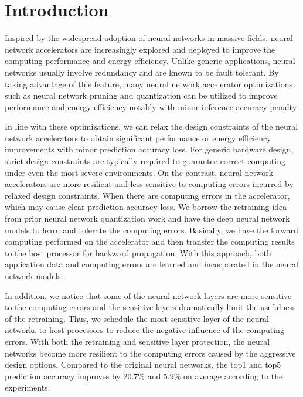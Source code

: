 \section{Introduction} \label{sec:intro}
Inspired by the widespread adoption of neural networks in massive fields, neural network accelerators 
\cite{deepburing_12,DiCecco_4} 
are increasingly explored and deployed to improve the computing performance and energy efficiency.
Unlike generic applications, neural networks usually involve redundancy and are known to be 
fault tolerant\cite{Reagen2016}. By taking advantage of this feature, many neural network accelerator optimizations 
such as neural network pruning and quantization can be utilized to improve 
performance and energy efficiency notably with minor inference accuracy penalty\cite{Han2016DeepCC}. 

In line with these optimizations, we can relax the design constraints of 
the neural network accelerators to obtain significant performance or energy efficiency 
improvements with minor prediction accuracy loss. 
For generic hardware design, strict design constraints are typically required to 
guarantee correct computing under even the most severe environments. On the contrast, 
neural network accelerators are more resilient and less sensitive to computing 
errors incurred by relaxed design constraints. When there are computing errors in the accelerator, 
which may cause clear prediction accuracy loss. We borrow the retraining 
idea from prior neural network quantization work \cite{Hwang2014_17} 
and have the deep neural network models to learn and tolerate the computing errors.  
Basically, we have the forward computing performed on the accelerator and 
then transfer the computing results to the host processor for 
backward propagation. With this approach, both application data and computing 
errors are learned and incorporated in the neural network models.  

In addition, we notice that some of the neural network layers are more sensitive to the 
computing errors and the sensitive layers dramatically limit the usefulness of the retraining. 
Thus, we schedule the most sensitive layer of the neural networks to host processors to reduce the negative influence 
of the computing errors. With both the retraining and sensitive layer protection, 
the neural networks become more resilient to the computing errors caused by 
the aggressive design options.
Compared to the original neural networks, the top1 and top5 prediction accuracy
improves by 20.7\% and 5.9\% on average according to the experiments. 

